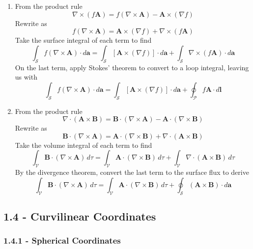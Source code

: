 \documentclass[a4paper]{article}
\begin{document}
\begin{enumerate}[label=(\alph*)]
	\item From the product rule
	\[
		\nabla \times \!\left( f \pmb{A} \right) = f \!\left( \nabla \times \pmb{A} \right) - \pmb{A} \times \!\left( \nabla f \right) 
	\]
	Rewrite as 
	\[
		f \!\left( \nabla \times \pmb{A} \right) = \pmb{A} \times \!\left( \nabla f \right) + \nabla \times \!\left( f \pmb{A} \right) 
	\]
	Take the surface integral of each term to find
	\[
		\int_{\mathcal{S}} f \!\left( \nabla \times \pmb{A} \right) \cdot d \pmb{a} = \int_{\mathcal{S}}\!\left[ \pmb{A} \times \!\left( \nabla f \right) \right] \cdot d \pmb{a} + \int_{\mathcal{S}} \nabla \times \!\left( f \pmb{A} \right) \cdot d \pmb{a}
	\]
	On the last term, apply Stokes' theorem to convert to a loop integral, leaving us with
	\[
		\int_{\mathcal{S}} f \!\left( \nabla \times \pmb{A} \right) \cdot d \pmb{a} = \int_{\mathcal{S}}\!\left[ \pmb{A} \times \!\left( \nabla f \right) \right] \cdot d \pmb{a} + \oint_{\mathcal{P}} f \pmb{A} \cdot d \pmb{l}
	\]
	\item From the product rule
	\[
		\nabla \cdot \!\left( \pmb{A} \times \pmb{B} \right) = \pmb{B} \cdot \!\left( \nabla \times \pmb{A} \right) - \pmb{A} \cdot \!\left( \nabla \times \pmb{B} \right)
	\]
	Rewrite as 
	\[
		\pmb{B} \cdot \!\left( \nabla \times \pmb{A} \right) = \pmb{A} \cdot \!\left( \nabla \times \pmb{B} \right) + \nabla \cdot \!\left( \pmb{A} \times \pmb{B} \right) 
	\]
	Take the volume integral of each term to find
	\[
		\int_{\mathcal{V}}\pmb{B} \cdot \!\left( \nabla \times \pmb{A} \right) \, d \tau = \int_{\mathcal{V}}\pmb{A} \cdot \!\left( \nabla \times \pmb{B} \right) \, d \tau + \int_{\mathcal{V}}\nabla \cdot \!\left( \pmb{A} \times \pmb{B} \right) \, d \tau
	\]
	By the divergence theorem, convert the last term to the surface flux to derive
	\[
		\int_{\mathcal{V}}\pmb{B} \cdot \!\left( \nabla \times \pmb{A} \right) \, d \tau = \int_{\mathcal{V}}\pmb{A} \cdot \!\left( \nabla \times \pmb{B} \right) \, d \tau + \oint_{\mathcal{S}} \!\left( \pmb{A} \times \pmb{B} \right) \cdot d \pmb{a}
	\]
\end{enumerate}

\newpage
\subsection{\textsf{1.4 - Curvilinear Coordinates}}
\subsubsection{\textsf{1.4.1 - Spherical Coordinates}}
\end{document}
